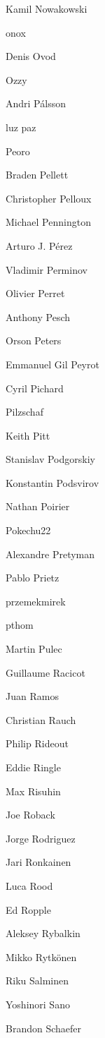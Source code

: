 \begin{DoxyItemize}
\item Kamil Nowakowski
\item onox
\item Denis Ovod
\item Ozzy
\item Andri Pálsson
\item luz paz
\item Peoro
\item Braden Pellett
\item Christopher Pelloux
\item Michael Pennington
\item Arturo J. Pérez
\item Vladimir Perminov
\item Olivier Perret
\item Anthony Pesch
\item Orson Peters
\item Emmanuel Gil Peyrot
\item Cyril Pichard
\item Pilzschaf
\item Keith Pitt
\item Stanislav Podgorskiy
\item Konstantin Podsvirov
\item Nathan Poirier
\item Pokechu22
\item Alexandre Pretyman
\item Pablo Prietz
\item przemekmirek
\item pthom
\item Martin Pulec
\item Guillaume Racicot
\item Juan Ramos
\item Christian Rauch
\item Philip Rideout
\item Eddie Ringle
\item Max Risuhin
\item Joe Roback
\item Jorge Rodriguez
\item Jari Ronkainen
\item Luca Rood
\item Ed Ropple
\item Aleksey Rybalkin
\item Mikko Rytkönen
\item Riku Salminen
\item Yoshinori Sano
\item Brandon Schaefer

\end{DoxyItemize}
